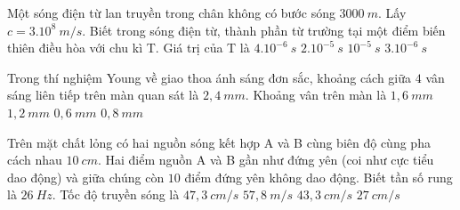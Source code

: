 	\begin{ex} %
		Một sóng điện từ lan truyền trong chân không có bước sóng $3000\ m$. Lấy $c=3.10^8\ m/s$. Biết trong sóng điện từ, thành phần từ trường tại một điểm biến thiên điều hòa với chu kì T. Giá trị của T là
		\choice
		{$4.10^{-6}\ s$}
		{$2.10^{-5}\ s$}
		{\True $10^{-5}\ s$}
		{$3.10^{-6}\ s$}
	\end{ex}
	\begin{ex} %
		Trong thí nghiệm Young về giao thoa ánh sáng đơn sắc, khoảng cách giữa $4$ vân sáng liên tiếp trên màn quan sát là $2,4\ mm$. Khoảng vân trên màn là
		\choice
		{$1,6\ mm$}	
		{$1,2\ mm$}
		{$0,6\ mm$}	
		{\True $0,8\ mm$}
	\end{ex}
	\begin{ex}%
		Trên mặt chất lỏng có hai nguồn sóng kết hợp A và B cùng biên độ cùng pha cách nhau $10\ cm$. Hai điểm nguồn A và B gần như đứng yên (coi như cực tiểu dao động) và giữa chúng còn $10$ điểm đứng yên không dao động. Biết tần số rung là $26\ Hz$. Tốc độ truyền sóng là
		\choice
		{\True $47,3\ cm/s$}
		{$57,8\ m/s$}
		{$43,3\ cm/s$}
		{$27\ cm/s$}
	\end{ex}
